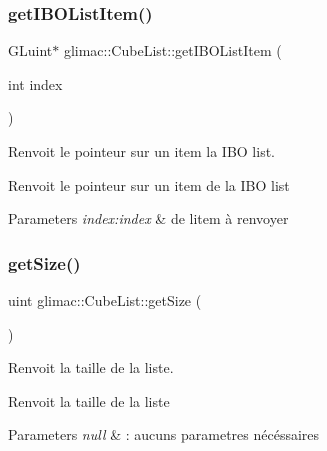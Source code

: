 \subsubsection{\texorpdfstring{get\+I\+B\+O\+List\+Item()}{getIBOListItem()}}
{\footnotesize\ttfamily G\+Luint$\ast$ glimac\+::\+Cube\+List\+::get\+I\+B\+O\+List\+Item (\begin{DoxyParamCaption}\item[{int}]{index }\end{DoxyParamCaption})\hspace{0.3cm}{\ttfamily [inline]}}



Renvoit le pointeur sur un item la I\+BO list. 

Renvoit le pointeur sur un item de la I\+BO list


\begin{DoxyParams}{Parameters}
{\em index\+:index} & de l\textquotesingle{}item à renvoyer \\
\hline
\end{DoxyParams}
\mbox{\label{classglimac_1_1CubeList_a22bdb56a8ad725631572e517234ac775}} 
\subsubsection{\texorpdfstring{get\+Size()}{getSize()}}
{\footnotesize\ttfamily uint glimac\+::\+Cube\+List\+::get\+Size (\begin{DoxyParamCaption}{ }\end{DoxyParamCaption})\hspace{0.3cm}{\ttfamily [inline]}}



Renvoit la taille de la liste. 

Renvoit la taille de la liste


\begin{DoxyParams}{Parameters}
{\em null} & \+: aucuns parametres nécéssaires \\
\hline
\end{DoxyParams}
\mbox{\label{classglimac_1_1CubeList_aeb6239962da1abae9cfc0e773b71c485}} 
